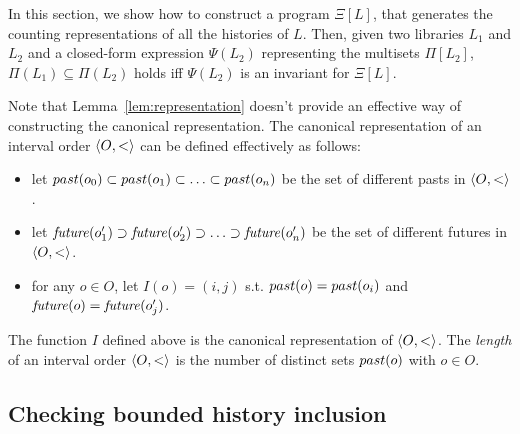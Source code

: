 In this section, we show how to construct a program $\Xi[L]$, that generates the counting representations
of all the histories of $L$. Then, given two libraries $L_1$ and $L_2$ and a closed-form expression $\Psi(L_2)$ 
representing the multisets $\Pi[L_2]$, $\Pi(L_1) \subseteq \Pi(L_2)$ holds iff $\Psi(L_2)$ is an invariant for $\Xi[L]$.


Note that Lemma~\ref{lem:representation} doesn't provide an effective way of
constructing the canonical representation. 
The canonical representation of an interval order $\left\langle {O,<} \right\rangle$ can be defined
effectively as follows:
\begin{itemize}

	\item let $past({o_0})\subset past({o_1})\subset \ldots\subset
past({o_n})$ be the set of different pasts in $\left\langle {O,<} \right\rangle$. 

	\item let $\mathit{future}({o_1'})\supset \mathit{future}({o_2'})\supset \ldots\supset
\mathit{future}({o_n'})$ be the set of different futures in $\left\langle {O,<} \right\rangle$.

	\item for any $o\in O$, let $I(o)=(i,j)$ s.t. $past({o})=past({o_i})$ and
$\mathit{future}({o})=\mathit{future}({o_j'})$.

\end{itemize}

\begin{lemma}

  The function $I$ defined above is the canonical representation of
  $\left\langle {O,<} \right\rangle$. The \emph{length} of an interval order $\left\langle {O,<} \right\rangle$ is the number
  of distinct sets $past({o})$ with $o\in O$.

\end{lemma}

\subsection{Checking bounded history inclusion}



